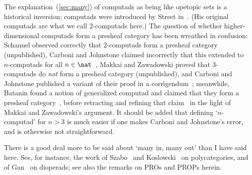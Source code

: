 \begin{notes}
The explanation~(\ref{sec:many}) of computads as being like opetopic sets
is a historical inversion; computads were introduced by Street
in~\cite{StrLIC}.  (His original computads are what we call 2-computads
here.)  The question of whether higher-dimensional computads form a
presheaf category has been wreathed in confusion: Schanuel%
%
%
observed
correctly that 2-computads form a presheaf category (unpublished), Carboni%
%
%
and Johnstone%
%
%
claimed incorrectly that this extended to $n$-computads for all
$n\in\nat$~\cite[4.6]{CJ}, Makkai and Zawadowski proved that 3-computads do
\emph{not} form a presheaf category (unpublished), and Carboni and
Johnstone published a variant of their proof in a
corrigendum~\cite{CJcorr}; meanwhile, Batanin%
%
%
found a notion of generalized
computad and claimed that they form a presheaf category~\cite{BatCFM},
before retracting and refining that claim~\cite{BatCSO} in the light of
Makkai and Zawadowski's argument.  It should be added that defining
`$n$-computad' for $n>3$ is much easier if one makes Carboni and
Johnstone's error, and is otherwise not straightforward. 

There is a good deal more to be said about `many in, many out' than I have
said here.  See, for instance, the work of Szabo~\cite{Sza}%
%
%
and
Koslowski~\cite{KosMAP}%
%
%
on polycategories,%
%
%
and of Gan~\cite{Gan}%
%
%
on
dioperads;%
%
%
see also the remarks on PROs and PROPs herein.


\end{notes}
